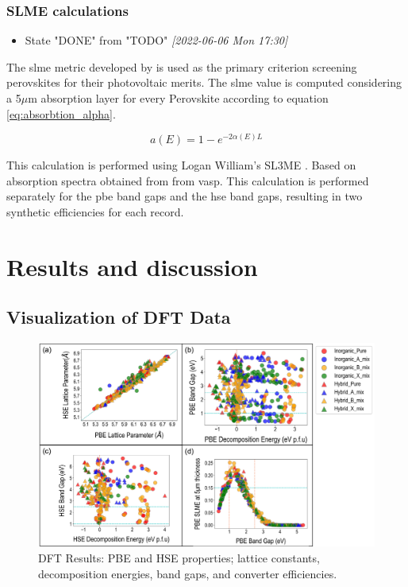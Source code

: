 \documentclass[twoside, twocolumn, 9pt, draft]{article}
\begin{document}
\subsubsection*{SLME calculations}
\label{sec:org18da948}
\begin{itemize}
\item State "DONE"       from "TODO"       \textit{[2022-06-06 Mon 17:30]}
\end{itemize}
The \gls{slme} metric developed by \citet{yu-2012-ident-poten} is used as the
primary criterion screening perovskites for their photovoltaic
merits. The \gls{slme} value is computed considering a 5\(\mu\)m absorption
layer for every Perovskite according to equation \eqref{eq:absorbtion_alpha}.

\begin{equation}\label{eq:absorbtion_alpha}
a(E)=1-e^{-2\alpha(E)L}
\end{equation}

This calculation is performed using Logan William's SL3ME
\cite{williams-2022-sl3me}. Based on absorption spectra obtained from
from \gls{vasp}. This calculation is performed separately for the \acrshort{pbe} band
gaps and the \acrshort{hse} band gaps, resulting in two synthetic efficiencies
for each record.

\section*{Results and discussion}
\label{sec:org7a12534}
\subsection*{Visualization of DFT Data}
\label{sec:orga9a2720}
\begin{figure}
\centering
\includegraphics[width=.9\linewidth]{./figs/screening_properties.png}
\caption{\label{fig:pairplots} DFT Results: PBE and HSE properties; lattice constants, decomposition energies, band gaps, and converter efficiencies.}
\end{figure}
\end{document}
